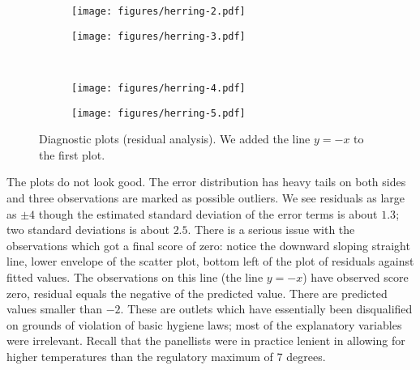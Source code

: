 \documentclass[alpha-refs]{wiley-article}
\begin{document}
\begin{figure}[htp]
\begin{subfigure}{0.5\textwidth}
\texttt{[image: figures/herring-2.pdf]}
\end{subfigure}
\begin{subfigure}{0.5\textwidth}
\texttt{[image: figures/herring-3.pdf]}
\end{subfigure}
\\[5pt]
\begin{subfigure}{0.5\textwidth}
\texttt{[image: figures/herring-4.pdf]}
\end{subfigure}
\begin{subfigure}{0.5\textwidth}
\texttt{[image: figures/herring-5.pdf]}
\end{subfigure}
\caption{Diagnostic plots (residual analysis). We added the line  $y = -x$ to the first plot.}
\label{fig:model-vali}
\end{figure}

The plots do not look good. The error distribution has heavy tails on both sides and three observations are marked as possible outliers.  We see residuals as large as $\pm 4$ though the estimated standard deviation of the error terms is about $1.3$; two standard deviations is about $2.5$. There is a serious issue with the observations which got a final score of zero: notice the downward sloping straight line, lower envelope of the scatter plot, bottom left of the plot of residuals against fitted values. The observations on this line (the line $y = - x$) have observed score zero, residual equals the negative of the predicted value. There are predicted values smaller than $-2$. These are outlets which have essentially been disqualified on grounds of violation of basic hygiene laws; most of the explanatory variables were irrelevant. 
Recall that the panellists were in practice lenient in allowing for higher temperatures than the regulatory maximum of 7 degrees. %
\end{document}
